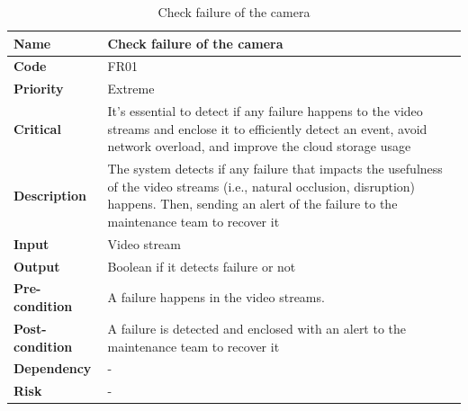 \documentclass[12pt]{article}
\begin{document}
\begin{table}[h!]
\caption{Check failure of the camera}
\begin{tabular}{|p{}|p{}|}
\hline
\textbf{Name}           &  Check failure of the camera \\ \hline
\textbf{Code}           &  FR01 \\ \hline
\textbf{Priority}       & Extreme \\ \hline
\textbf{Critical}       & It's essential to detect if any failure happens to the video streams and enclose it to efficiently detect an event, avoid network overload, and improve the cloud storage usage \\ \hline
\textbf{Description}    & The system detects if any failure that impacts the usefulness of the video streams (i.e., natural occlusion, disruption) happens. Then, sending an alert of the failure to the maintenance team to recover it   \\ \hline
\textbf{Input}          & Video stream                                                                             \\ \hline
\textbf{Output}         & Boolean if it detects failure or not                                                                             \\ \hline
\textbf{Pre-condition}  & A failure happens in the video streams.                                                                                                                                                                    \\ \hline
\textbf{Post-condition} & A failure is detected and enclosed with an alert to the maintenance team to recover it      \\ \hline
\textbf{Dependency}     & -                                      \\ \hline
\textbf{Risk}           & - \\ \hline
\end{tabular}
\end{table} 
 \FloatBarrier
\end{document}
